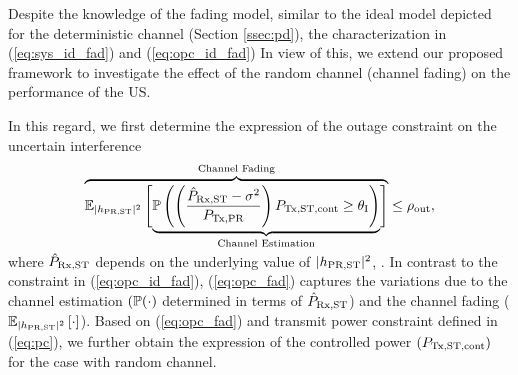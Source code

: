 Despite the knowledge of the fading model, similar to the ideal model depicted for the deterministic channel (Section \ref{ssec:pd}), the characterization in (\ref{eq:sys_id_fad}) and (\ref{eq:opc_id_fad})  In view of this, we extend our proposed framework to investigate the effect of the random channel (channel fading) on the performance of the US.

In this regard, we first determine the expression of the outage constraint on the uncertain interference  
\begin{align}
\smash[b]{\overbrace{\e{\pgpo}{\smash[b]{\underbrace{\p\left( \left( \frac{\eprcvd - \nps}{\ptran}\right) \preg \ge \ite \right)}_{\text{Channel Estimation}}}}}^{\text{Channel Fading}}} \le \opc, \label{eq:opc_fad} \\[0.5em] \nonumber 
\end{align}
where $\hat{P}_{\text{Rx,ST}}$ depends on the underlying value of $|h_{\text{PR,ST}}|^2$, . In contrast to the constraint in (\ref{eq:opc_id_fad}), (\ref{eq:opc_fad}) captures the variations due to the channel estimation $(\mathbb P(\cdot)$ determined in terms of $\hat{P}_{\text{Rx,ST}}$) and the channel fading (${\mathbb E}_{|h_{\text{PR,ST}}|^2}\left[ \cdot \right]$). Based on (\ref{eq:opc_fad}) and transmit power constraint defined in (\ref{eq:pc}), we further obtain the expression of the controlled power $(P_{\text{Tx,ST,cont}})$ for the case with random channel.

